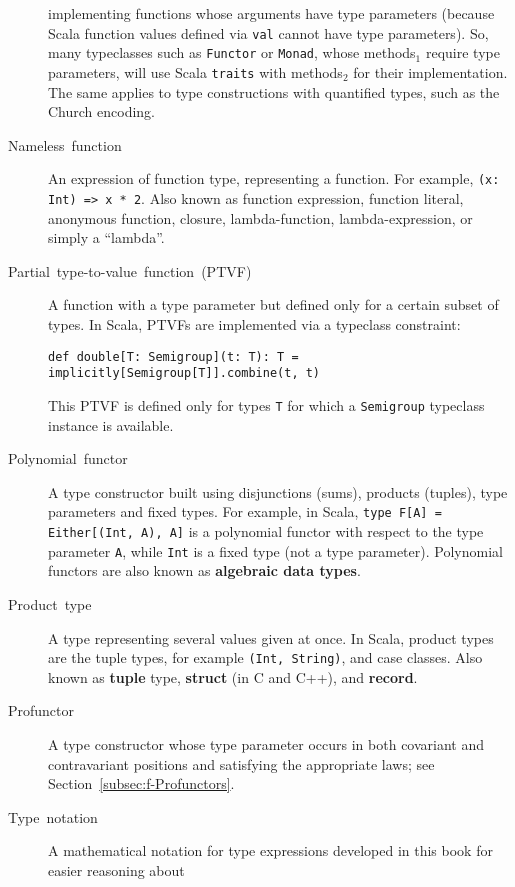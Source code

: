 \begin{description}
implementing functions whose arguments have type parameters (because
Scala function values defined via \lstinline!val! cannot have type
parameters). So, many typeclasses such as \lstinline!Functor! or
\lstinline!Monad!, whose methods$_{1}$ require type parameters,
will use Scala \lstinline!traits! with methods$_{2}$ for their implementation.
The same applies to type constructions with quantified types, such
as the Church encoding. 
\item [{Nameless~function}] An expression of
function type, representing a function. For example, \lstinline!(x: Int) => x * 2!.
Also known as function expression, function literal, anonymous function,
closure, lambda-function,
lambda-expression, or simply a ``lambda''.
\item [{Partial~type-to-value~function~(PTVF)}] A function with a type
parameter but defined only for a certain subset of types.
In Scala, PTVFs are implemented via a typeclass constraint:
\begin{lstlisting}
def double[T: Semigroup](t: T): T = implicitly[Semigroup[T]].combine(t, t)
\end{lstlisting}
This PTVF is defined only for types \lstinline!T! for which a \lstinline!Semigroup!
typeclass instance is available.
\item [{Polynomial~functor}] A type constructor
built using disjunctions (sums), products (tuples), type parameters
and fixed types. For example, in Scala, \lstinline!type F[A] = Either[(Int, A), A]!
is a polynomial functor with respect to the type parameter \lstinline!A!,
while \lstinline!Int! is a fixed type (not a type parameter). Polynomial
functors are also known as \textbf{algebraic data types}.
\item [{Product~type}] A type representing several
values given at once. In Scala, product types are the tuple types,
for example \lstinline!(Int, String)!, and case classes. Also known
as \textbf{tuple} type, \textbf{struct} (in C and C++),
and \textbf{record}.
\item [{\index{profunctor}Profunctor}] A type constructor whose type parameter
occurs in both covariant and contravariant positions and satisfying
the appropriate laws; see Section~\ref{subsec:f-Profunctors}.
\item [{Type~notation}] A mathematical notation
for type expressions developed in this book for easier reasoning about

\end{description}

